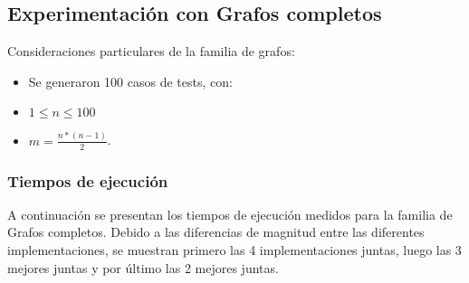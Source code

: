 \subsection{Experimentación con Grafos completos}

Consideraciones particulares de la familia de grafos:
\begin{itemize}
    \item Se generaron 100 casos de tests, con:
    \item $1 \leq n \leq 100$
    \item $m = \frac{n*(n-1)}{2}$.
\end{itemize}

\subsubsection{Tiempos de ejecución}

A continuación se presentan los tiempos de ejecución medidos para la familia de Grafos completos. Debido a las diferencias de magnitud entre las diferentes implementaciones, se muestran primero las 4 implementaciones juntas, luego las 3 mejores juntas y por último las 2 mejores juntas.

